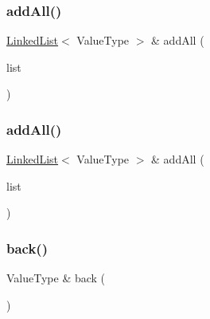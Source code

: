 \mbox{\label{classLinkedList_a1c99533be0fd8af3d62d3cc41b2ff1cb}} 
\subsubsection{\texorpdfstring{add\+All()}{addAll()}\hspace{0.1cm}{\footnotesize\ttfamily [1/2]}}
{\footnotesize\ttfamily \mbox{\hyperlink{classLinkedList}{Linked\+List}}$<$ Value\+Type $>$ \& add\+All (\begin{DoxyParamCaption}\item[{const \mbox{\hyperlink{classLinkedList}{Linked\+List}}$<$ Value\+Type $>$ \&}]{list }\end{DoxyParamCaption})}

\mbox{\label{classLinkedList_ae5de21c6c9261adbe14860d81fa7c984}} 
\subsubsection{\texorpdfstring{add\+All()}{addAll()}\hspace{0.1cm}{\footnotesize\ttfamily [2/2]}}
{\footnotesize\ttfamily \mbox{\hyperlink{classLinkedList}{Linked\+List}}$<$ Value\+Type $>$ \& add\+All (\begin{DoxyParamCaption}\item[{std\+::initializer\+\_\+list$<$ Value\+Type $>$}]{list }\end{DoxyParamCaption})}

\mbox{\label{classLinkedList_a2bad145b40a82c36986f67610313658d}} 
\subsubsection{\texorpdfstring{back()}{back()}\hspace{0.1cm}{\footnotesize\ttfamily [1/2]}}
{\footnotesize\ttfamily Value\+Type \& back (\begin{DoxyParamCaption}{ }\end{DoxyParamCaption})}

\mbox{\label{classLinkedList_adc761c91bdacd01bed5c96e25fd9486a}} 
